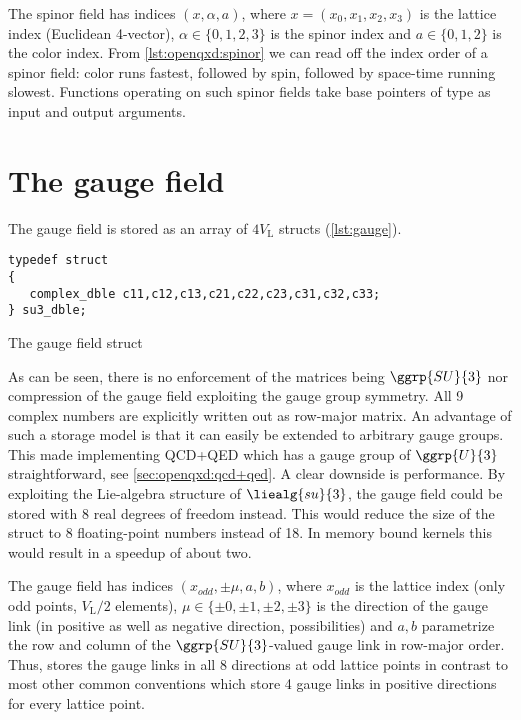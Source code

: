 The spinor field has indices $(x, \alpha, a)$, where $x=(x_0,x_1,x_2,x_3)$ is the lattice index (Euclidean 4-vector), $\alpha \in \{0,1,2,3\}$ is the spinor index and $a \in \{0,1,2\}$ is the color index.
From \cref{lst:openqxd:spinor} we can read off the index order of a spinor field: color runs fastest, followed by spin, followed by space-time running slowest.
Functions operating on such spinor fields take base pointers of type  as input and output arguments.

\section{The gauge field}
\label{sec:openqxd:gauge:field}

The gauge field is stored as an array of $4V_\mathrm{L}$  structs (\cref{lst:gauge}).
\begin{codelisting}
\begin{verbatim}
typedef struct
{
   complex_dble c11,c12,c13,c21,c22,c23,c31,c32,c33;
} su3_dble;
\end{verbatim}
\caption{The gauge field struct}
\label{lst:gauge}
\end{codelisting}
As can be seen, there is no enforcement of the matrices being $\ggrp{SU}{3}$ nor compression of the gauge field exploiting the gauge group symmetry. All \num{9} complex numbers are explicitly written out as row-major matrix. An advantage of such a storage model is that it can easily be extended to arbitrary gauge groups. This made implementing QCD+QED which has a gauge group of $\ggrp{U}{3}$ straightforward, see \cref{sec:openqxd:qcd+qed}. A clear downside is performance. By exploiting the Lie-algebra structure of $\liealg{su}{3}$, the gauge field could be stored with \num{8} real degrees of freedom instead. This would reduce the size of the struct to \num{8} floating-point numbers instead of \num{18}. In memory bound kernels this would result in a speedup of about two.

The gauge field has indices $(x_{odd}, \pm \mu, a, b)$, where $x_{odd}$ is the lattice index (only odd points, $V_\mathrm{L}/2$ elements), $\mu \in \{\pm 0, \pm 1, \pm 2, \pm 3\}$ is the direction of the gauge link (in positive as well as negative direction,  possibilities) and $a,b$ parametrize the row and column of the $\ggrp{SU}{3}$-valued gauge link in row-major order.
Thus, \openqxd stores the gauge links in all \num{8} directions at odd lattice points in contrast to most other common conventions which store \num{4} gauge links in positive directions for every lattice point.

